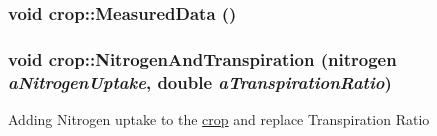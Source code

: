 \label{classcrop_ab0b92e4e8ee085757f97ebffb299a721}
\hypertarget{classcrop_a87faf3aada27a5f2bfc506bf265d67b7}{
\subsubsection[{MeasuredData}]{\setlength{\rightskip}{0pt plus 5cm}void crop::MeasuredData ()}}
\label{classcrop_a87faf3aada27a5f2bfc506bf265d67b7}
\hypertarget{classcrop_a4ed6aaf98890015fb52d4d8957313166}{
\subsubsection[{NitrogenAndTranspiration}]{\setlength{\rightskip}{0pt plus 5cm}void crop::NitrogenAndTranspiration ({\bf nitrogen} {\em aNitrogenUptake}, \/  double {\em aTranspirationRatio})}}
\label{classcrop_a4ed6aaf98890015fb52d4d8957313166}
Adding Nitrogen uptake to the \hyperlink{classcrop}{crop} and replace Transpiration Ratio 


